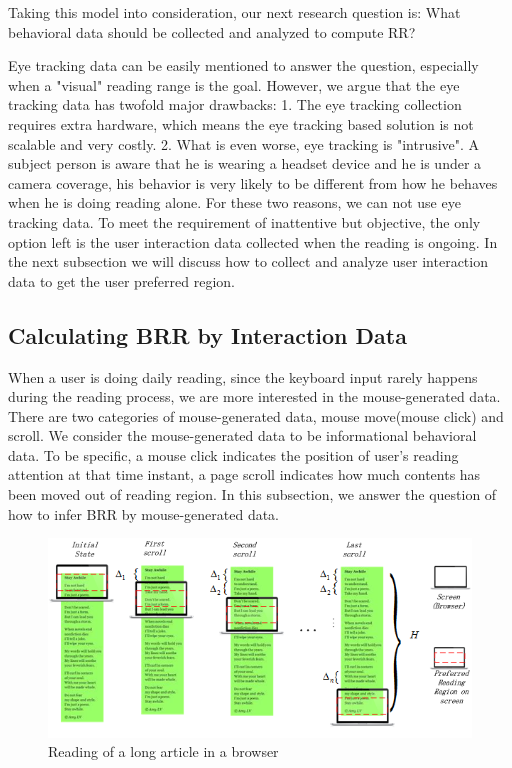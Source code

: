 \documentclass{sigchi}
\begin{document}
Taking this model into consideration, our next  research question is: 
What behavioral data should be collected and analyzed to compute RR?

Eye tracking data can be easily mentioned to answer the question, especially when a "visual" reading range is 
the goal. However, we argue that the eye tracking data has twofold major drawbacks: 1. The eye tracking collection 
requires extra hardware, which means the eye tracking  based solution  is not scalable and very costly. 2. What is even worse, 
eye tracking is "intrusive". A subject person is aware that he is wearing a headset device and he is under a camera coverage, 
his behavior is very likely to be different from how he behaves when he is doing reading alone. For these two reasons, we 
can not use eye tracking data. To meet the requirement of inattentive but objective, the only option left is the user interaction data 
collected when the reading is ongoing.  In the next subsection we will discuss how to collect and analyze user
 interaction data to get the user preferred region.


\subsection{Calculating BRR by Interaction Data}

When a user is doing daily reading,  since the keyboard input rarely happens 
during the reading process,  we are more interested in the mouse-generated data. 
There are two categories of mouse-generated data, mouse move(mouse click) and scroll.  We consider the mouse-generated data to be 
informational  behavioral data. To be specific, a  mouse click indicates the position of user's reading attention at that time instant, 
a page scroll indicates how much contents has been moved out of reading region.
In this subsection, we answer the question of how to infer 
BRR by  mouse-generated data. 


\begin{figure}[t]
\centering
\includegraphics[width=1.5\columnwidth]{pictures/scroll}
\caption{Reading of a long article in a browser}
\label{fig:scroll}
\end{figure}
\end{document}
